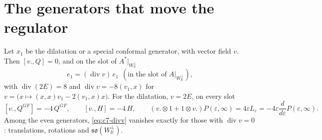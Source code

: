 \section{The generators that move the regulator}

\begin{proposition}
\label{prop:c7-dil}
Let $x_1$ be the dilatation or a special conformal generator, with vector field $v$. Then $[v.,Q]=0$, and on the slot of $A^*|_{W_{\mathbb R}^\perp}$
\begin{equation}
[v.,Q^{GF}]\,e_1=(\operatorname{div}v)\,e_1\ \ (\text{in the slot of }A|_{W_{\mathbb R}^\perp}),
\label{eq:c7-divv}
\end{equation}
with $\operatorname{div}(2E)=8$ and $\operatorname{div}v=-8(v_1,x)$ for $v=\big(x\mapsto(x,x)v_1-2(v_1,x)x\big)$. For the dilatation, $v=2E$, on every slot
\[
[v.,Q^{GF}]=-4\,Q^{GF},\qquad [v.,H]=-4\,H,\qquad (v.\otimes1+1\otimes v.)P(\varepsilon,\infty)=4\varepsilon L_\varepsilon=-4\varepsilon\frac{d}{d\varepsilon}P(\varepsilon,\infty).
\]
Among the even generators, \eqref{eq:c7-divv} vanishes exactly for those with $\operatorname{div}v=0$: translations, rotations and $\mathfrak{so}(W_{\mathbb R}^\perp)$.
\end{proposition}

